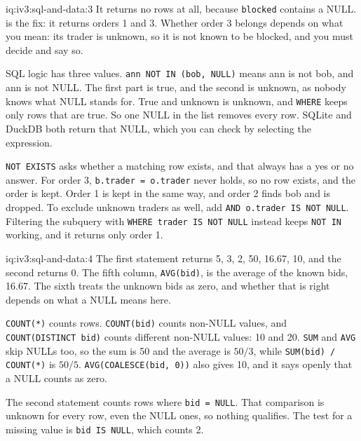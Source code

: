 \begin{solution}{iq:iv3:sql-and-data:3}
It returns no rows at all, because \texttt{blocked} contains a NULL.  is the fix: it returns orders 1 and 3. Whether order 3 belongs depends on what you mean: its trader is unknown, so it is not known to be blocked, and you must decide and say so.
\label{lst:iv3:sq:notexists}

SQL logic has three values. \texttt{\textquotesingle{}ann\textquotesingle{} NOT IN (\textquotesingle{}bob\textquotesingle{}, NULL)} means ann is not bob, and ann is not NULL. The first part is true, and the second is unknown, as nobody knows what NULL stands for. True and unknown is unknown, and \texttt{WHERE} keeps only rows that are true. So one NULL in the list removes every row. SQLite and DuckDB both return that NULL, which you can check by selecting the expression.

\texttt{NOT EXISTS} asks whether a matching row exists, and that always has a yes or no answer. For order 3, \texttt{b.trader = o.trader} never holds, so no row exists, and the order is kept. Order 1 is kept in the same way, and order 2 finds bob and is dropped. To exclude unknown traders as well, add \texttt{AND o.trader IS NOT NULL}. Filtering the subquery with \texttt{WHERE trader IS NOT NULL} instead keeps \texttt{NOT IN} working, and it returns only order 1.

\end{solution}

\begin{solution}{iq:iv3:sql-and-data:4}
The first statement returns 5, 3, 2, 50, 16.67, 10, and the second returns 0. The fifth column, \texttt{AVG(bid)}, is the average of the known bids, 16.67. The sixth treats the unknown bids as zero, and whether that is right depends on what a NULL means here.

\texttt{COUNT(*)} counts rows. \texttt{COUNT(bid)} counts non-NULL values, and \texttt{COUNT(DISTINCT bid)} counts different non-NULL values: 10 and 20. \texttt{SUM} and \texttt{AVG} skip NULLs too, so the sum is 50 and the average is $50 / 3$, while \texttt{SUM(bid) / COUNT(*)} is $50 / 5$. \texttt{AVG(COALESCE(bid, 0))} also gives 10, and it says openly that a NULL counts as zero.

The second statement counts rows where \texttt{bid = NULL}. That comparison is unknown for every row, even the NULL ones, so nothing qualifies. The test for a missing value is \texttt{bid IS NULL}, which counts 2.

\end{solution}

